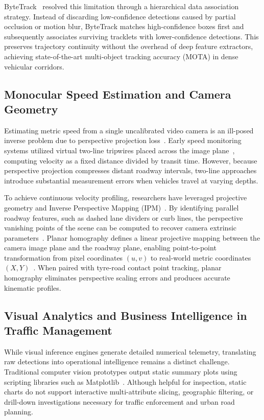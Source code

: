 \documentclass[conference]{IEEEtran}
\begin{document}
ByteTrack~\cite{zhang2022bytetrack} resolved this limitation through a hierarchical data association strategy. Instead of discarding low-confidence detections caused by partial occlusion or motion blur, ByteTrack matches high-confidence boxes first and subsequently associates surviving tracklets with lower-confidence detections. This preserves trajectory continuity without the overhead of deep feature extractors, achieving state-of-the-art multi-object tracking accuracy (MOTA) in dense vehicular corridors.

\subsection{Monocular Speed Estimation and Camera Geometry}
Estimating metric speed from a single uncalibrated video camera is an ill-posed inverse problem due to perspective projection loss~\cite{hartley2003multiple}. Early speed monitoring systems utilized virtual two-line tripwires placed across the image plane~\cite{schoepflin2003dynamic}, computing velocity as a fixed distance divided by transit time. However, because perspective projection compresses distant roadway intervals, two-line approaches introduce substantial measurement errors when vehicles travel at varying depths.

To achieve continuous velocity profiling, researchers have leveraged projective geometry and Inverse Perspective Mapping (IPM)~\cite{dubska2014fully, he2019vehicle}. By identifying parallel roadway features, such as dashed lane dividers or curb lines, the perspective vanishing points of the scene can be computed to recover camera extrinsic parameters~\cite{luvizon2017video, sochor2017comprehensive}. Planar homography defines a linear projective mapping between the camera image plane and the roadway plane, enabling point-to-point transformation from pixel coordinates $(u, v)$ to real-world metric coordinates $(X, Y)$~\cite{hartley2003multiple}. When paired with tyre-road contact point tracking, planar homography eliminates perspective scaling errors and produces accurate kinematic profiles.

\subsection{Visual Analytics and Business Intelligence in Traffic Management}
While visual inference engines generate detailed numerical telemetry, translating raw detections into operational intelligence remains a distinct challenge. Traditional computer vision prototypes output static summary plots using scripting libraries such as Matplotlib~\cite{kanhere2008taxonomy}. Although helpful for inspection, static charts do not support interactive multi-attribute slicing, geographic filtering, or drill-down investigations necessary for traffic enforcement and urban road planning.
\end{document}
